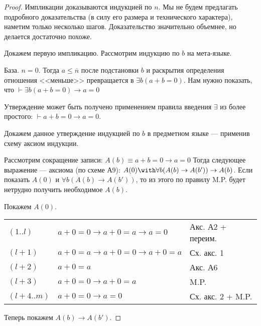 \begin{proof}
Импликации доказываются индукцией по $n$. Мы не будем предлагать подробного доказательства
(в силу его размера и технического характера), наметим только несколько шагов. Доказательство
значительно объемнее, но делается достаточно похоже.

Докажем первую импликацию. Рассмотрим индукцию по $b$ на мета-языке.

База. $n=0$. Тогда $a \le \overline{n}$ после подстановки $b$ и раскрытия определения отношения <<меньше>> 
превращается в $\exists b (a + b = 0)$. 
Нам нужно показать, что $\vdash \exists b (a+b = 0) \rightarrow a=0$ 

Утверждение может быть получено применением правила введения $\exists$ из
более простого: $\vdash a + b = 0 \rightarrow a = 0$.

Докажем данное утверждение индукцией по $b$ в предметном языке --- 
применив схему аксиом индукции.

Рассмотрим сокращение записи: $A(b) \equiv a + b = 0 \rightarrow a=0$
Тогда следующее выражение --- аксиома (по схеме А9):
$A(0) \with \forall b (A(b) \rightarrow A(b')) \rightarrow A(b)$.
Если показать $A(0)$ и $\forall b (A(b) \rightarrow A(b'))$, то из
этого по правилу M.P. будет нетрудно получить необходимое $A(b)$.

Покажем $A(0)$.

\begin{tabular}{lll}
$(1..l)$ & $a + 0 = 0 \rightarrow a + 0 = a \rightarrow a = 0$ & Акс. А2 + переим.\\
$(l+1)$ & $a + 0 = a \rightarrow a + 0 = 0 \rightarrow a + 0 = a$ & Сх. акс. 1\\
$(l+2)$ & $a + 0 = a$ & Акс. А6\\
$(l+3)$ & $a + 0 = 0 \rightarrow a+0=a$ & M.P.\\
$(l+4..m)$ & $a + 0 = 0 \rightarrow a = 0$ & Сх. акс. 2 + M.P.\\
\end{tabular}

Теперь покажем $A(b)\rightarrow A(b')$. 


\end{proof}
